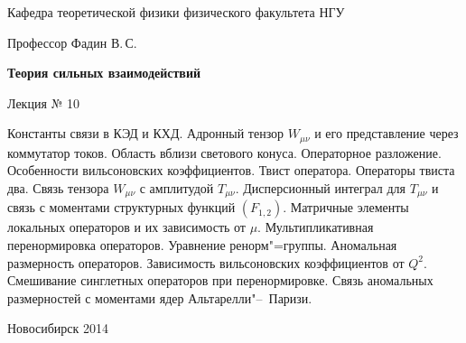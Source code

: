 \documentclass[12pt,pagesize,paper=192mm:108mm]{scrbook}
\begin{document}
\begin{titlepage}
\begin{center}
    Кафедра теоретической физики физического факультета НГУ

    \Large
    Профессор Фадин В.\,С.

    \huge
    \textbf{Теория сильных взаимодействий}
    
    \Large
    Лекция № 10
    \vfill
    
    \normalsize
    \begin{minipage}{0.95\linewidth}
      \small Константы связи в КЭД и КХД. Адронный тензор $W_{\mu\nu}$ и его
      представление через коммутатор токов. Область вблизи светового
      конуса. Операторное разложение. Особенности вильсоновских
      коэффициентов. Твист оператора. Операторы твиста два. Связь
      тензора $W_{\mu\nu}$ с амплитудой $T_{\mu\nu}$. Дисперсионный
      интеграл для $T_{\mu\nu}$ и связь с моментами структурных
      функций $(F_{1,2})$. Матричные элементы локальных операторов и
      их зависимость от $\mu$. Мультипликативная перенормировка
      операторов. Уравнение ренорм"=группы. Аномальная размерность
      операторов. Зависимость вильсоновских коэффициентов от
      $Q^2$. Смешивание синглетных операторов при
      перенормировке. Связь аномальных размерностей с моментами ядер
      Альтарелли"--~Паризи.
    \end{minipage}
    \vfill
    
    \normalsize \ccbysa\hspace{0.5em}   Новосибирск 2014   
  \end{center}
\end{titlepage}
\end{document}
